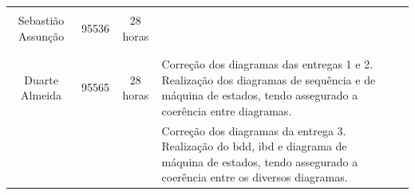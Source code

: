\documentclass{article}
\begin{document}
\begin{table}[H]
\begin{tabular}{|l|l|l|l|l}
        \multicolumn{1}{|l|}{}                   & \multicolumn{1}{l|}{}       & \multicolumn{1}{l|}{}                             & \multicolumn{1}{l|}{}                   &  \\
        \multicolumn{1}{|c|}{Sebastião Assunção} & \multicolumn{1}{c|}{95536}  & \multicolumn{1}{c|}{28 horas}                     & \multicolumn{1}{l|}{}                   &  \\
        \multicolumn{1}{|l|}{}                   & \multicolumn{1}{l|}{}       & \multicolumn{1}{l|}{}                             & \multicolumn{1}{l|}{}                   &  \\
        \multicolumn{1}{|l|}{}                   & \multicolumn{1}{l|}{}       & \multicolumn{1}{l|}{}                             & \multicolumn{1}{l|}{}                   &  \\ \cline{1-4}
        \multicolumn{1}{|l|}{}                   & \multicolumn{1}{l|}{}       & \multicolumn{1}{l|}{}                             & \multirow{5}{7cm}{Correção dos diagramas das entregas 1 e 2. Realização dos diagramas de sequência e de máquina de estados, tendo assegurado a coerência entre diagramas.}                   &  \\
        \multicolumn{1}{|l|}{}                   & \multicolumn{1}{l|}{}       & \multicolumn{1}{l|}{}                             & \multicolumn{1}{l|}{}                   &  \\
        \multicolumn{1}{|c|}{Duarte Almeida}     & \multicolumn{1}{c|}{95565}  & \multicolumn{1}{c|}{28 horas}                     & \multicolumn{1}{l|}{}                   &  \\
        \multicolumn{1}{|l|}{}                   & \multicolumn{1}{l|}{}       & \multicolumn{1}{l|}{}                             & \multicolumn{1}{l|}{}                   &  \\
        \multicolumn{1}{|l|}{}                   & \multicolumn{1}{l|}{}       & \multicolumn{1}{l|}{}                             & \multicolumn{1}{l|}{}                   &  \\ \cline{1-4}
        \multicolumn{1}{|l|}{}                   & \multicolumn{1}{l|}{}       & \multicolumn{1}{l|}{}                             & \multirow{5}{7cm}{Correção dos diagramas da entrega 3. Realização do bdd, ibd e diagrama de máquina de estados, tendo assegurado a coerência entre os diversos diagramas.}                   &  \\
        \multicolumn{1}{|l|}{}                   & \multicolumn{1}{l|}{}       & \multicolumn{1}{l|}{}                             & \multicolumn{1}{l|}{}                   &  \\

\end{tabular}
\end{table}
\end{document}
